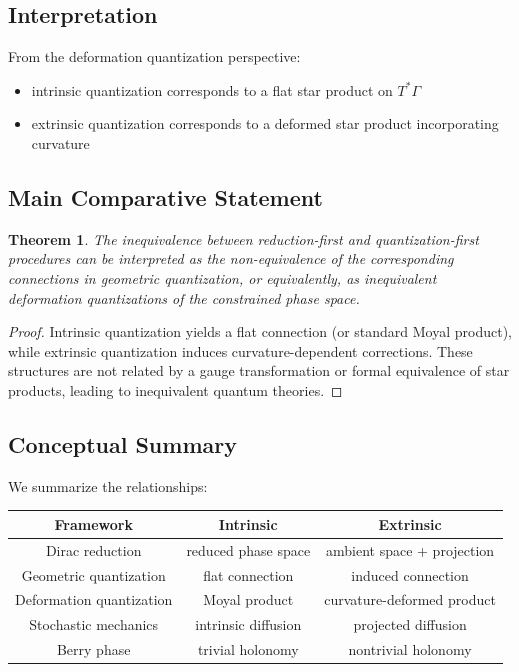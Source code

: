 \documentclass[11pt]{article}
\newtheorem{theorem}{Theorem}[section]
\begin{document}
\subsection{Interpretation}

From the deformation quantization perspective:

\begin{itemize}
\item intrinsic quantization corresponds to a flat star product on $T^*\Gamma$
\item extrinsic quantization corresponds to a deformed star product incorporating curvature
\end{itemize}

\subsection{Main Comparative Statement}

\begin{theorem}
The inequivalence between reduction-first and quantization-first procedures can be interpreted as the non-equivalence of the corresponding connections in geometric quantization, or equivalently, as inequivalent deformation quantizations of the constrained phase space.
\end{theorem}

\begin{proof}
Intrinsic quantization yields a flat connection (or standard Moyal product), while extrinsic quantization induces curvature-dependent corrections. These structures are not related by a gauge transformation or formal equivalence of star products, leading to inequivalent quantum theories.
\end{proof}

\subsection{Conceptual Summary}

We summarize the relationships:

\begin{center}
\begin{tabular}{c|c|c}
Framework & Intrinsic & Extrinsic \\
\hline
Dirac reduction & reduced phase space & ambient space + projection \\
Geometric quantization & flat connection & induced connection \\
Deformation quantization & Moyal product & curvature-deformed product \\
Stochastic mechanics & intrinsic diffusion & projected diffusion \\
Berry phase & trivial holonomy & nontrivial holonomy
\end{tabular}
\end{center}
\end{document}
